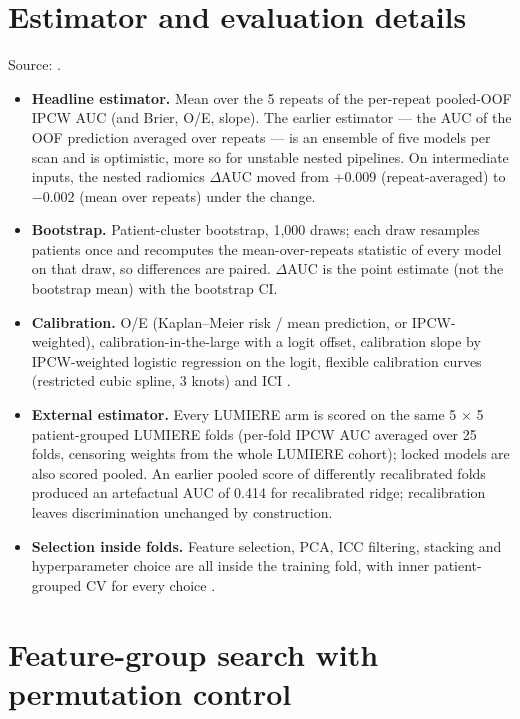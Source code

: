 \documentclass[11pt,a4paper]{article}
\begin{document}
\FloatBarrier
\section{Estimator and evaluation details}\label{sec:S9}

Source: .

\begin{itemize}
\item \textbf{Headline estimator.} Mean over the 5 repeats of the per-repeat pooled-OOF IPCW AUC (and Brier,
O/E, slope). The earlier estimator --- the AUC of the OOF prediction averaged over repeats --- is an ensemble
of five models per scan and is optimistic, more so for unstable nested pipelines. On intermediate inputs, the
nested radiomics $\Delta$AUC moved from +0.009 (repeat-averaged) to $-$0.002 (mean over repeats) under the
change.
\item \textbf{Bootstrap.} Patient-cluster bootstrap, 1,000 draws; each draw resamples patients once and
recomputes the mean-over-repeats statistic of every model on that draw, so differences are paired. $\Delta$AUC
is the point estimate (not the bootstrap mean) with the bootstrap CI.
\item \textbf{Calibration.} O/E (Kaplan--Meier risk / mean prediction, or IPCW-weighted),
calibration-in-the-large with a logit offset, calibration slope by IPCW-weighted logistic regression on the
logit, flexible calibration curves (restricted cubic spline, 3 knots) and ICI \citep{vancalster2019}.
\item \textbf{External estimator.} Every LUMIERE arm is scored on the same 5 $\times$ 5 patient-grouped
LUMIERE folds (per-fold IPCW AUC averaged over 25 folds, censoring weights from the whole LUMIERE cohort);
locked models are also scored pooled. An earlier pooled score of differently recalibrated folds produced an
artefactual AUC of 0.414 for recalibrated ridge; recalibration leaves discrimination unchanged by
construction.
\item \textbf{Selection inside folds.} Feature selection, PCA, ICC filtering, stacking and hyperparameter
choice are all inside the training fold, with inner patient-grouped CV for every choice
\citep{varma2006,cawley2010,demircioglu2021}.
\end{itemize}

\FloatBarrier
\section{Feature-group search with permutation control}\label{sec:S10}
\end{document}
